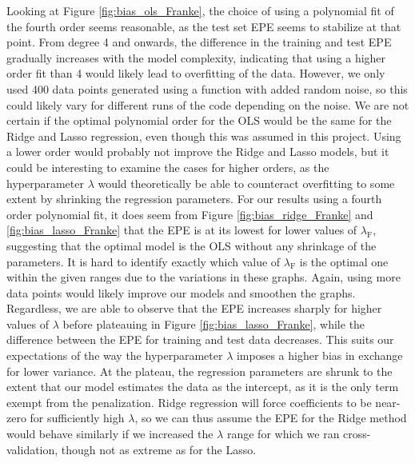 \documentclass[a4paper, 10pt]{article}
\begin{document}
\begin{multicols}{2}
Looking at Figure \ref{fig:bias_ols_Franke}, the choice of using a polynomial fit of the fourth order seems reasonable, as the test set EPE seems to stabilize at that point. From degree 4 and onwards, the difference in the training and test EPE gradually increases with  the model complexity, indicating that using a higher order fit than 4 would likely lead to overfitting of the data. However, we only used 400 data points generated using a function with added random noise, so this could likely vary for different runs of the code depending on the noise.  We are not certain if the optimal polynomial order for the OLS would be the same for the Ridge and Lasso regression, even though this was assumed in this project. Using a lower order would probably not improve the Ridge and Lasso models, but it could be interesting to examine the cases for higher orders, as the hyperparameter $\lambda$ would theoretically be able to counteract overfitting to some extent by shrinking the regression parameters.  For our results using a fourth order polynomial fit, it does seem from Figure \ref{fig:bias_ridge_Franke} and \ref{fig:bias_lasso_Franke} that the EPE is at its lowest for lower values of $\lambda_\text{F}$, suggesting that the optimal model is the OLS without any shrinkage of the parameters. It is hard to identify exactly which value of $\lambda_\text{F}$ is the optimal one within the given ranges due to the variations in these graphs. Again, using more data points would likely improve our models and smoothen the graphs.  Regardless, we are able to observe that the EPE increases sharply for higher values of $\lambda$ before plateauing in Figure \ref{fig:bias_lasso_Franke}, while the difference between the EPE for training and test data decreases. This suits our expectations of the way the hyperparameter $\lambda$ imposes a higher bias in exchange for lower variance. At the plateau, the regression parameters are shrunk to the extent that our model estimates the data as the intercept, as it is the only term exempt from the penalization. Ridge regression will force coefficients to be near-zero for sufficiently high $\lambda$, so we can thus assume the EPE for the Ridge method would behave similarly  if we increased the $\lambda$ range for which we ran cross-validation, though not as extreme as for the Lasso.


\end{multicols}
\end{document}
